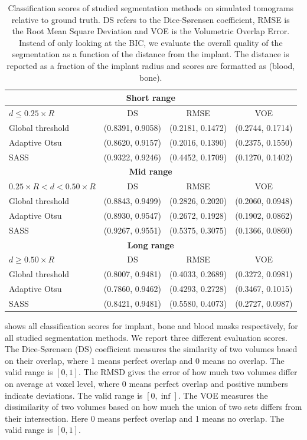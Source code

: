 \begin{table}[]
\caption{
	Classification scores of studied segmentation methods on simulated
	tomograms relative to ground truth. DS refers to the Dice-Sørensen
	coefficient, RMSE is the Root Mean Square Deviation and VOE is the
	Volumetric Overlap Error. Instead of only looking at the BIC, we
	evaluate the overall quality of the segmentation as a function of the
	distance from the implant. The distance is reported as a fraction of the
	implant radius and scores are formatted as (blood, bone).
        }
\label{tab:scores}
\centering
\begin{tabular}{lccc}
\bottomrule
\multicolumn{4}{c}{\textbf{Short range}} \\
\toprule
$d \leq 0.25 \times R$ & DS & RMSE & VOE \\
\midrule
Global threshold & (0.8391, 0.9058) & (0.2181, 0.1472) & (0.2744, 0.1714) \\
Adaptive Otsu    & (0.8620, 0.9157) & (0.2016, 0.1390) & (0.2375, 0.1550) \\
SASS             & (0.9322, 0.9246) & (0.4452, 0.1709) & (0.1270, 0.1402) \\
\bottomrule
\multicolumn{4}{c}{\textbf{Mid range}} \\
\toprule
$ 0.25 \times R < d < 0.50 \times R$ & DS & RMSE & VOE \\
\midrule
Global threshold & (0.8843, 0.9499) & (0.2826, 0.2020) & (0.2060, 0.0948) \\
Adaptive Otsu    & (0.8930, 0.9547) & (0.2672, 0.1928) & (0.1902, 0.0862) \\
SASS             & (0.9267, 0.9551) & (0.5375, 0.3075) & (0.1366, 0.0860) \\
\bottomrule
\multicolumn{4}{c}{\textbf{Long range}} \\
\toprule
$d \geq 0.50 \times R$   & DS & RMSE & VOE \\
\midrule
Global threshold & (0.8007, 0.9481) & (0.4033, 0.2689) & (0.3272, 0.0981) \\
Adaptive Otsu    & (0.7860, 0.9462) & (0.4293, 0.2728) & (0.3467, 0.1015) \\
SASS             & (0.8421, 0.9481) & (0.5580, 0.4073) & (0.2727, 0.0987) \\
\bottomrule
\end{tabular}
\end{table}

 shows all classification scores for implant, bone and blood masks
respectively, for all studied segmentation methods. We report three different
evaluation scores. The Dice-Sørensen (DS) coefficient measures the similarity
of two volumes based on their overlap, where 1 means perfect overlap and 0
means no overlap. The valid range is $[0,1]$. The RMSD gives the error of how
much two volumes differ on average at voxel level, where 0 means perfect
overlap and positive numbers indicate deviations. The valid range is
$[0,\inf]$. The VOE measures the dissimilarity of two volumes based on how much
the union of two sets differs from their intersection. Here 0 means perfect
overlap and 1 means no overlap. The valid range is $[0,1]$.

